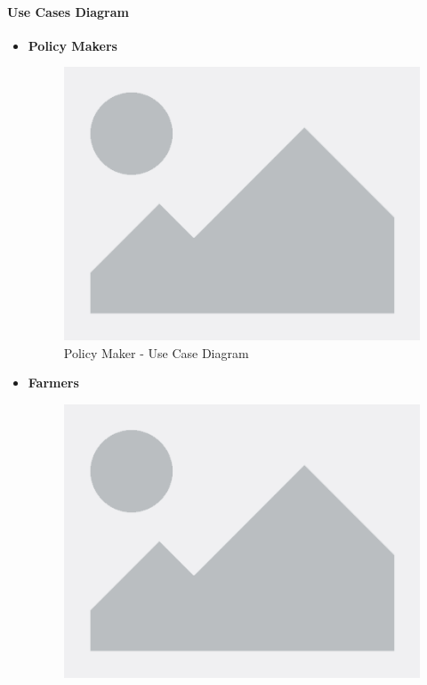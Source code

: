 \documentclass[table, 12pt]{article} %
\begin{document}
      \paragraph{Use Cases Diagram}
    \begin{itemize}
        \item \textbf {Policy Makers}
        \begin{center}
            \begin{figure}[H]
                \includegraphics[scale=0.55, center]{assets/placeholder.png}
                \caption{Policy Maker - Use Case Diagram}
                \label{fig: UseCase_PolicyMaker}
            \end{figure}
        \end{center}
        \newpage
        \item \textbf {Farmers}
        \begin{center}
            \begin{figure}[H]
                \includegraphics[scale=0.60, center]{assets/placeholder.png}

\end{figure}
\end{center}
\end{itemize}
\end{document}

